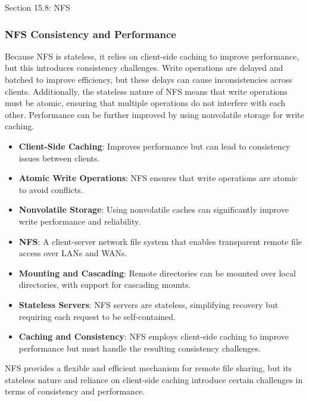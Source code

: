 \begin{notes}{Section 15.8: NFS}
\begin{highlight}
    \end{highlight}
    
    \subsubsection*{NFS Consistency and Performance}
    
    Because NFS is stateless, it relies on client-side caching to improve performance, but this introduces consistency challenges. Write operations are delayed and batched to improve efficiency, 
    but these delays can cause inconsistencies across clients. Additionally, the stateless nature of NFS means that write operations must be atomic, ensuring that multiple operations do not interfere 
    with each other. Performance can be further improved by using nonvolatile storage for write caching.
    
    \begin{highlight}
    
        \begin{itemize}
            \item \textbf{Client-Side Caching}: Improves performance but can lead to consistency issues between clients.
            \item \textbf{Atomic Write Operations}: NFS ensures that write operations are atomic to avoid conflicts.
            \item \textbf{Nonvolatile Storage}: Using nonvolatile caches can significantly improve write performance and reliability.
        \end{itemize}
    
    \end{highlight}
    
    \begin{highlight}
    
        \begin{itemize}
            \item \textbf{NFS}: A client-server network file system that enables transparent remote file access over LANs and WANs.
            \item \textbf{Mounting and Cascading}: Remote directories can be mounted over local directories, with support for cascading mounts.
            \item \textbf{Stateless Servers}: NFS servers are stateless, simplifying recovery but requiring each request to be self-contained.
            \item \textbf{Caching and Consistency}: NFS employs client-side caching to improve performance but must handle the resulting consistency challenges.
        \end{itemize}
    
    NFS provides a flexible and efficient mechanism for remote file sharing, but its stateless nature and reliance on client-side caching introduce certain challenges in terms of consistency and performance.
    
    \end{highlight}
\end{notes}